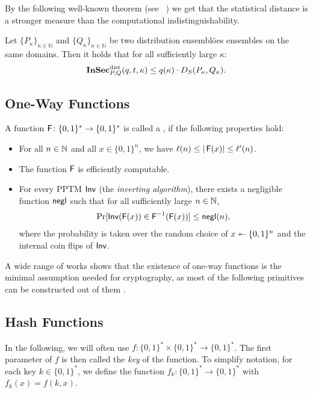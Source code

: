 By the following well-known theorem (see
\eg~\cite[p.173]{goldreich2004foundations}) we get that the statistical
distance is a stronger measure than the computational
indistinguishability.


\begin{theorem}
\label{thm:statistically}
Let $\{P_{\kappa}\}_{\kappa\in \mathbb{N}}$ and
$\{Q_{\kappa}\}_{\kappa\in \mathbb{N}}$ be two distribution ensemblöes
ensembles on the same domains.
Then it holds that for all sufficiently large $\kappa$:
\begin{align*}
 \operatorname{\mathbf{InSec}}^{\operatorname{dist}}_{P,Q}(q,t,\kappa)\leq q(\kappa)\cdot D_{S}(P_{\kappa},Q_{\kappa}).
\end{align*}
\end{theorem}




\subsection*{One-Way Functions}
A function $\operatorname{\mathsf{F}}\colon \{0,1\}^{*}\to \{0,1\}^{*}$ is called a
, if the following properties hold:
\begin{itemize}
\item For all $n\in
  \mathbb{N}$ and all $x\in \{0,1\}^{n}$, we have $\ell(n)\leq |\operatorname{\mathsf{F}}(x)|\leq
  \ell'(n)$. 
\item The function $\operatorname{\mathsf{F}}$ is efficiently computable.
\item For every \ac{PPTM} $\operatorname{\mathsf{Inv}}$ (the \emph{inverting algorithm}), there
  exists a negligible function $\operatorname{\mathsf{negl}}$ such that for all sufficiently
  large $n\in \mathbb{N}$,
  \begin{align*}
    \Pr[\operatorname{\mathsf{Inv}}(\operatorname{\mathsf{F}}(x))\in \operatorname{\mathsf{F}}^{-1}(\operatorname{\mathsf{F}}(x))]\leq \operatorname{\mathsf{negl}}(n),
  \end{align*}
where the probability is taken over the random choice of $x\twoheadleftarrow \{0,1\}^{n}$ and the
internal coin flips of $\operatorname{\mathsf{Inv}}$.
\end{itemize}

A wide range of works shows that the existence of one-way functions is
the minimal assumption needed for cryptography, as most of the following
primitives can be constructed out of them
\cite[pp. 181-225]{lindell2007introduction}. 

\subsection*{Hash Functions}
In the following, we will often use  $f\colon
\{0,1\}^{*}\times \{0,1\}^{*}\to \{0,1\}^{*}$. The first parameter of
$f$ is then called the \emph{key} of the function. To simplify notation,
for each key $k\in \{0,1\}^{*}$, we define the function $f_{k}\colon
\{0,1\}^{*}\to \{0,1\}^{*}$ with $f_{k}(x)=f(k,x)$.

